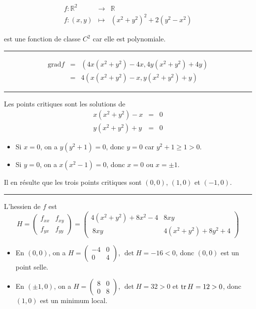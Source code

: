 \documentclass[a4paper,12pt]{article}
\def\R{\mathbb{R}}
\def\tr{\mathop{\rm tr}}
\begin{document}
\begin{eqnarray*}
	f: \R^2 &\to& \R \\
	f:(x,y) &\mapsto& (x^2 + y^2)^2  + 2(y^2 - x^2) 
\end{eqnarray*}

est une fonction de classe $C^2$ car elle est polynomiale. 


\hrule

\begin{eqnarray*}
 \mathrm{grad} f &=& (4x(x^2 + y^2) - 4x, 4y(x^2 + y^2) + 4y) \\
		 &=& 4(x(x^2 +
y^2) - x, y(x^2 + y^2) + y)
\end{eqnarray*}

\hrule
\vspace{1cm}

Les points critiques sont les solutions de 
\begin{eqnarray*}
x(x^2 + y^2) - x &=& 0 \\
y(x^2 + y^2) + y &=& 0
\end{eqnarray*}

\begin{itemize}
	\item	
Si $x = 0$, on a $y(y^2 + 1) = 0$, donc $y = 0$ car $y^2 + 1 \geq 1 >0$.
\item
Si $y = 0$, on a $x(x^2 - 1) = 0$, donc $x = 0$ ou $x= \pm 1$.
\end{itemize}

Il en résulte que les trois points critiques sont $(0,0)$, $(1,0)$ et
$(-1,0)$.

\vspace{1cm}
\hrule
\vspace{1cm}


L'hessien de $f$ est
$$H = \begin{pmatrix} f_{xx} & f_{xy} \\ f_{yx} & f_{yy}
\end{pmatrix} = 
\begin{pmatrix} 4(x^2 + y^2) + 8x^2 - 4& 8xy \\ 
\ 8xy  & 4(x^2 + y^2) + 8y^2 + 4 \end{pmatrix}$$

\begin{itemize}

\item
	En $(0,0)$, on a $H = \begin{pmatrix} -4 & 0 \\ 0 & 4
	\end{pmatrix}$, 
	$\det H = -16 < 0$, donc $(0,0)$ est un point selle.
\item
	En $(\pm1,0)$, on a $H = \begin{pmatrix} 8 & 0 \\ 0 &
		8
	\end{pmatrix}$,
	$\det H = 32 > 0$ et $\tr H = 12 > 0$, donc $(1,0)$
	est un minimum local.

\end{itemize}
\end{document}
